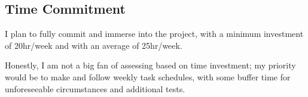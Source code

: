 \subsection{Time Commitment}
    I plan to fully commit and immerse into the project, with a minimum investment of 20hr/week and with an average of 25hr/week. 
    
    Honestly, I am not a big fan of assessing based on time investment; my priority would be to make and follow weekly task schedules, with some buffer time for unforeseeable circumstances and additional tests.

